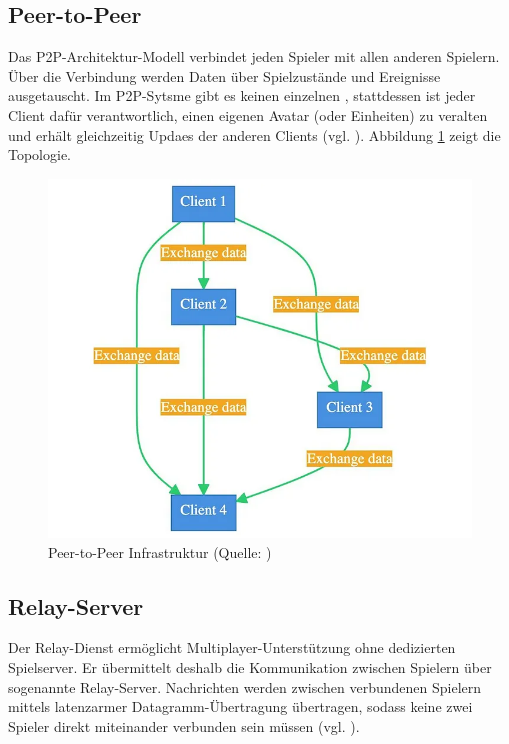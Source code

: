 \subsection{Peer-to-Peer}
Das \ac{P2P}-Architektur-Modell verbindet jeden Spieler mit allen anderen Spielern. Über die Verbindung werden Daten über Spielzustände und Ereignisse ausgetauscht. Im  \ac{P2P}-Sytsme gibt es keinen einzelnen , stattdessen ist jeder Client dafür verantwortlich, einen eigenen Avatar (oder Einheiten) zu veralten und erhält gleichzeitig Updaes der anderen Clients (vgl. \cite{mygames_unity_2024}). Abbildung \ref{fig:p-2-p} zeigt die Topologie.

\begin{figure}[ht]
\centering
\includegraphics[width=1\linewidth]{content/pictures/0_poGQC2fWQ3tPWPwT.png}
\caption{Peer-to-Peer Infrastruktur (Quelle: \cite{mygames_unity_2024})}
\label{fig:p-2-p}
\end{figure}


\subsection{Relay-Server}
Der Relay-Dienst ermöglicht Multiplayer-Unterstützung ohne dedizierten Spielserver. Er übermittelt deshalb die Kommunikation zwischen Spielern über sogenannte Relay-Server. Nachrichten werden zwischen verbundenen Spielern mittels latenzarmer Datagramm-Übertragung übertragen, sodass keine zwei Spieler direkt miteinander verbunden sein müssen (vgl. \cite{noauthor_relay_nodate}).

